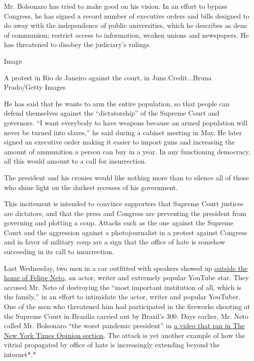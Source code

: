 Mr. Bolsonaro has tried to make good on his vision. In an effort to
bypass Congress, he has signed a record number of executive orders and
bills designed to do away with the independence of public universities,
which he describes as dens of communism; restrict access to information,
weaken unions and newspapers. He has threatened to disobey the
judiciary's rulings.

Image

A protest in Rio de Janeiro against the court, in June.Credit...Bruna
Prado/Getty Images

He has said that he wants to arm the entire population, so that people
can defend themselves against the ``dictatorship'' of the Supreme Court
and governors. ``I want everybody to have weapons because an armed
population will never be turned into slaves,'' he said during a cabinet
meeting in May. He later signed an executive order making it easier to
import guns and increasing the amount of ammunition a person can buy in
a year. In any functioning democracy, all this would amount to a call
for insurrection.

The president and his cronies would like nothing more than to silence
all of those who shine light on the darkest recesses of his government.

This incitement is intended to convince supporters that Supreme Court
justices are dictators, and that the press and Congress are preventing
the president from governing and plotting a coup. Attacks such as the
one against the Supreme Court and the aggression against a
photojournalist in a protest against Congress and in favor of military
coup are a sign that the office of hate is somehow succeeding in its
call to insurrection.

Last Wednesday, two men in a car outfitted with speakers showed up
\href{https://esportes.yahoo.com/noticias/aliados-jair-bolsonaro-atacam-casa-felipe-neto-010129218.html}{outside
the home of Felipe Neto}, an actor, writer and extremely popular YouTube
star. They accused Mr. Neto of destroying the ``most important
institution of all, which is the family,'' in an effort to intimidate
the actor, writer and popular YouTuber. One of the men who threatened
him had participated in the fireworks shooting at the Supreme Court in
Brasilía carried out by Brazil's 300. Days earlier, Mr. Neto called Mr.
Bolsonaro ``the worst pandemic president'' in
\href{https://www.nytimes.com/2020/07/15/opinion/coronavirus-covid-brazil-bolsonaro.html}{a
video that ran in The New York Times Opinion section}. The attack is yet
another example of how the vitriol propagated by office of hate is
increasingly extending beyond the internet*.*

